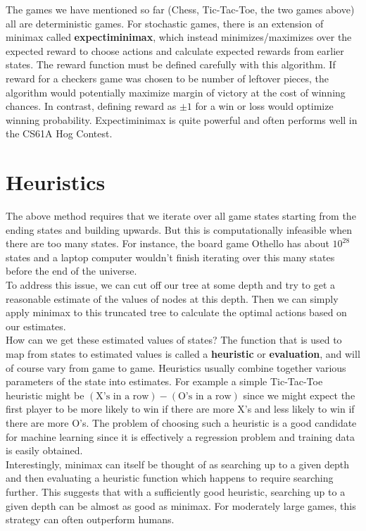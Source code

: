 \documentclass[12pt, letterpaper]{article}
\begin{document}
The games we have mentioned so far (Chess, Tic-Tac-Toe, the two games above) all are deterministic games. For stochastic games, there is an extension of minimax called \textbf{expectiminimax}, which instead minimizes/maximizes over the expected reward to choose actions and calculate expected rewards from earlier states. The reward function must be defined carefully with this algorithm. If reward for a checkers game was chosen to be number of leftover pieces, the algorithm would potentially maximize margin of victory at the cost of winning chances. In contrast, defining reward as $\pm 1$ for a win or loss would optimize winning probability. Expectiminimax is quite powerful and often performs well in the CS61A Hog Contest.
\section*{Heuristics}
The above method requires that we iterate over all game states starting from the ending states and building upwards. But this is computationally infeasible when there are too many states. For instance, the board game Othello has about $10^{28}$ states and a laptop computer wouldn't finish iterating over this many states before the end of the universe. \\[0.2cm]
To address this issue, we can cut off our tree at some depth and try to get a reasonable estimate of the values of nodes at this depth. Then we can simply apply minimax to this truncated tree to calculate the optimal actions based on our estimates. \\[0.2cm]
How can we get these estimated values of states? The function that is used to map from states to estimated values is called a \textbf{heuristic} or \textbf{evaluation}, and will of course vary from game to game. Heuristics usually combine together various parameters of the state into estimates. For example a simple Tic-Tac-Toe heuristic might be $(\text{X's in a row}) - (\text{O's in a row})$ since we might expect the first player to be more likely to win if there are more X's and less likely to win if there are more O's. The problem of choosing such a heuristic is a good candidate for machine learning since it is effectively a regression problem and training data is easily obtained. \\[0.2cm]
Interestingly, minimax can itself be thought of as searching up to a given depth and then evaluating a heuristic function which happens to require searching further. This suggests that with a sufficiently good heuristic, searching up to a given depth can be almost as good as minimax. For moderately large games, this strategy can often outperform humans.
\newpage
\end{document}

